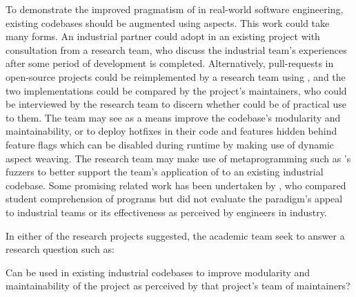 To demonstrate the improved pragmatism of \aop{} in real-world software
engineering, existing codebases should be augmented using aspects. This work
could take many forms. An industrial partner could adopt \aop{} in an existing
project with consultation from a research team, who discuss the industrial
team's experiences after some period of \aspectoriented development is
completed. Alternatively, pull-requests in open-source projects could be
reimplemented by a research team using \aspectorientation{}, and the two
implementations could be compared by the project's maintainers, who could be
interviewed by the research team to discern whether \aop{} could be of practical
use to them. The team may see \aop{} as a means improve the codebase's
modularity and maintainability, or to deploy hotfixes in their code and features
hidden behind feature flags which can be disabled during runtime by making use
of dynamic aspect weaving. The research team may make use of
\aspectoriented{}
metaprogramming such as \pdsfthree{}'s fuzzers to better support the team's
application of \aop{} to an existing industrial codebase. Some promising related
work has been undertaken by \citet{przybylek2018empirical}, who compared student
comprehension of \aspectoriented{} programs but did not evaluate the paradigm's
appeal to industrial teams or its effectiveness as perceived by engineers in
industry.  

In either of the research projects suggested, the academic team seek to answer a
research question such as:

\begin{researchquestion}
Can \aop{} be used in existing industrial codebases to improve modularity and
maintainability of the project as perceived by that project's team of maintainers?
\end{researchquestion}



